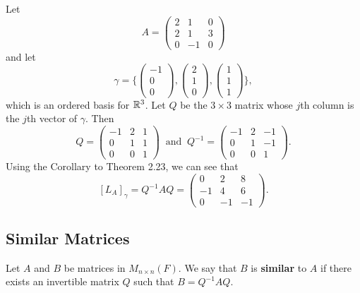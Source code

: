 \begin{eg}
    Let 
    \[  A = \begin{pmatrix}
        2 & 1 & 0 \\
        2 & 1 & 3 \\
        0 & -1 & 0 
    \end{pmatrix} \]
    and let 
    \[  \gamma = \Bigg\{ \begin{pmatrix}
        -1 \\
        0 \\
        0
    \end{pmatrix}, \begin{pmatrix}
        2 \\
        1 \\
        0
    \end{pmatrix}, \begin{pmatrix}
        1 \\
        1 \\
        1 
    \end{pmatrix} \Bigg\}, \] which is an ordered basis for \( \mathbb{R}^{3}  \). Let \( Q  \) be the \( 3 \times 3  \) matrix whose \( j \)th column is the \( j \)th vector of \( \gamma \). Then
    \[ Q = \begin{pmatrix}
        -1 & 2 & 1 \\
        0 & 1 & 1 \\
        0 & 0 & 1 
    \end{pmatrix} \ \text{ and } \ Q^{-1} = \begin{pmatrix}
        -1 & 2 & -1 \\
        0 & 1 & -1 \\
        0 & 0 & 1 
    \end{pmatrix}.    \]
    Using the Corollary to Theorem 2.23, we can see that
    \[  [{L}_{A}]_{\gamma} = Q^{-1} A Q = \begin{pmatrix}
        0 & 2 & 8 \\
        -1 & 4 & 6 \\
        0 & -1 & -1 
    \end{pmatrix}. \]
\end{eg}

\subsection{Similar Matrices}

\begin{definition}
    Let \( A  \) and \( B  \) be matrices in \( {M}_{n \times n }(F)  \). We say that \( B  \) is \textbf{similar} to \( A  \) if there exists an invertible matrix \( Q  \) such that \( B = Q^{-1}A Q  \). 
\end{definition}

